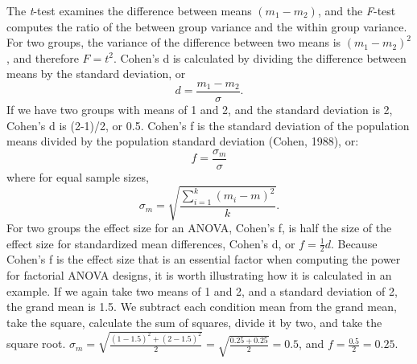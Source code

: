 \documentclass[,jou, draftfirst, a4paper,floatsintext]{apa6}
\begin{document}
The \emph{t}-test examines the difference between means \((m_1 - m_2)\), and the \emph{F}-test computes the ratio of the between group variance and the within group variance.
For two groups, the variance of the difference between two means is \((m_1 - m_2)^2\), and therefore \(F = t^2\).
Cohen's d is calculated by dividing the difference between means by the standard deviation, or
\begin{equation}
d = \frac{m_1-m_2}{\sigma}.
\end{equation}
If we have two groups with means of 1 and 2, and the standard deviation is 2, Cohen's d is (2-1)/2, or 0.5.
Cohen's f is the standard deviation of the population means divided by the population standard deviation (Cohen, 1988), or:
\begin{equation}
f = \frac{\sigma _{ m }}{\sigma}
\end{equation}
where for equal sample sizes,
\begin{equation}
\sigma _{ m } = \sqrt { \frac { \sum_ { i = 1 } ^ { k } ( m _ { i } - m ) ^ { 2 } } { k } }.
\end{equation}
For two groups the effect size for an ANOVA, Cohen's f, is half the size of the effect size for standardized mean differences, Cohen's d, or \(f = \frac{1}{2}d\). Because Cohen's f is the effect size that is an essential factor when computing the power for factorial ANOVA designs, it is worth illustrating how it is calculated in an example.
If we again take two means of 1 and 2, and a standard deviation of 2, the grand mean is 1.5.
We subtract each condition mean from the grand mean, take the square, calculate the sum of squares, divide it by two, and take the square root.
\(\sigma_m = \sqrt{\frac{(1-1.5)^2+(2-1.5)^2}{2}} = \sqrt{\frac{0.25+0.25}{2}} = 0.5\), and \(f = \frac{0.5}{2} = 0.25.\)
\end{document}
